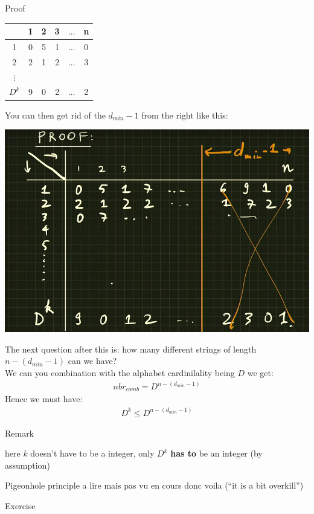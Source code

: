 \begin{parag}{Proof}
    \begin{center}
    \begin{tabular}{|c|c|c|c|c|c|}
        & 1 & 2 & 3 & $\ldots$ & n \\
        \hline
        1 & 0 & 5 & 1 &$\ldots$ & 0 \\
        \hline
        2 & 2 & 1 & 2 & $\ldots$ & 3  \\
        $\vdots$ \\
        \hline
        $D^k$ &  9 & 0 & 2 & $\ldots$ & 2
    \end{tabular}
    \end{center}
    You can then get rid of the $d_{min} - 1$ from the right like this:
    \begin{center}
        \includegraphics[scale=0.3]{22025-04-30.png}
    \end{center}
    The next question after this is: how many different strings of length $n- \left(d_{min} - 1\right)$ can we have?\\
    We can you combination with the alphabet cardinilality being $D$ we get:
    \begin{align*} nbr_{comb} = D^{n - \left(d_{min} - 1\right)} \end{align*}
    Hence we must have:
    \begin{align*} D^k \leq D^{n-\left(d_{min}-1\right)} \end{align*}
    
    
    \begin{subparag}{Remark}
        \begin{framedremark}
            here $k$ doesn't have to be a integer, only $D^k$ \textbf{has to } be an integer (by assumption) 
        \end{framedremark}
        
        
    \end{subparag} 
\end{parag}

\begin{parag}{Pigeonhole principle}
   a lire mais pas vu en cours donc voila  (``it is a bit overkill'')
\end{parag}
\begin{parag}{Exercise}

    
\end{parag}








